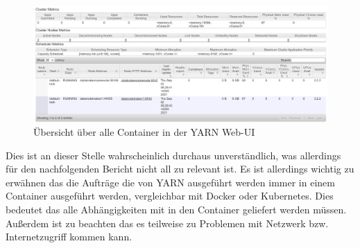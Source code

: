 \documentclass[12pt,oneside,a4paper,parskip]{scrbook}
\begin{document}
\begin{figure}[H]
	\centering
	\includegraphics[scale=0.3]{clusterNodeOverview.png}
	\captionsetup{justification=centering}
	\caption{\"Ubersicht \"uber alle Container in der YARN Web-UI}
	\label{pic:yarnOverview}
\end{figure}
Dies ist an dieser Stelle wahrscheinlich durchaus unverst\"andlich, was allerdings f\"ur den nachfolgenden Bericht nicht all zu relevant ist.
\newline Es ist allerdings wichtig zu erw\"ahnen das die Auftr\"age die von YARN ausgef\"uhrt werden immer in einem Container ausgef\"uhrt werden, vergleichbar mit Docker oder Kubernetes. Dies bedeutet das alle Abh\"angigkeiten mit in den Container geliefert werden m\"ussen. Außerdem ist zu beachten das es teilweise zu Problemen mit Netzwerk bzw. Internetzugriff kommen kann.
\end{document}
